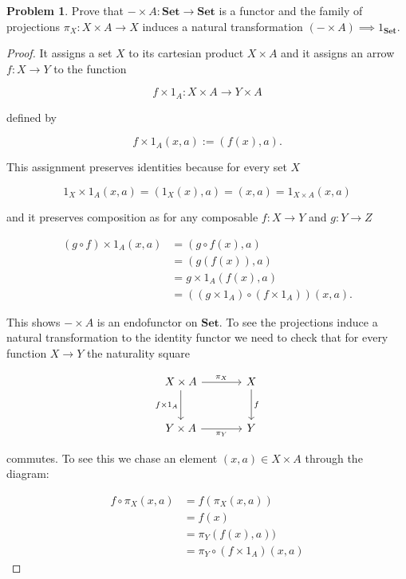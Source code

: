 \documentclass[11pt]{amsart}
\theoremstyle{plain}
\theoremstyle{definition}
\newtheorem{prob}{Problem}
\newcommand{\Set}{{\mathbf{Set}}}
\newcommand{\noi}{{\noindent}}
\begin{document}
\begin{prob}
Prove that $- \times A : \Set \to \Set$ is a functor and the family of projections $\pi_X : X \times A \to X$ induces a natural transformation $(- \times A) \implies 1_\Set$. 
\end{prob}
\begin{proof}
It assigns a set $X$ to its cartesian product $X \times A$ and it assigns an arrow $f : X \to Y$ to the function 

\[ f \times 1_A : X \times A \to Y \times A \]

\noi defined by 

\[ f \times 1_A ( x,a) := (f(x), a) .\]

\noi This assignment preserves identities because for every set $X$

\[ 1_X \times 1_A (x,a) = (1_X (x), a) = (x,a) = 1_{X \times A}(x,a) \]


\noi and it preserves composition as for any composable $f : X \to Y$ and $g : Y \to Z$ 

\begin{align*} 
(g \circ f) \times 1_A (x,a) 
&= (g \circ f (x), a) \\
&= \left( g(f(x)) , a \right)\\
&= g \times 1_A \left(f(x), a\right)\\
&= \left((g \times 1_A) \circ (f \times 1_A)\right) (x,a).
\end{align*}

\noi This shows $- \times A$ is an endofunctor on $\Set$. To see the projections induce a natural transformation to the identity functor we need to check that for every function $X \to Y$ the naturality square 

\[\begin{tikzcd}[column sep = large, row sep = large]
X \times A \dar["f \times 1_A"']\rar["\pi_X"] & X \dar["f"]\\
Y \times A \rar["\pi_Y"'] & Y
\end{tikzcd}\]

\noi commutes. To see this we chase an element $(x,a) \in X \times A$ through the diagram: 

\begin{align*}
f \circ \pi_X(x,a) 
&= f ( \pi_X (x,a))\\
&= f(x) \\
&= \pi_Y(f(x),a)) \\
&= \pi_Y \circ (f \times 1_A) (x,a) 
\end{align*}
\end{proof}
\end{document}
